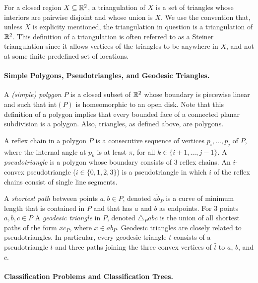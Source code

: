 \documentclass[lotsofwhite]{patmorin}
\newcommand{\interior}{\mathrm{int}}
\newcommand{\z}[1]{{\hat{#1}}}
\begin{document}
For a closed region $X\subseteq \mathbb{R}^2$, a triangulation of $X$ is a set
of triangles whose interiors are pairwise disjoint and whose union is
$X$.  We use the convention that, unless $X$ is explicity mentioned,
the triangulation in question is a triangulation of $\mathbb{R}^2$.  This
definition of a triangulation is often referred to as a Steiner
triangulation since it allows vertices of the triangles to be anywhere
in $X$, and not at some finite predefined set of locations.

\paragraph{Simple Polygons, Pseudotriangles, and Geodesic Triangles.}

A \emph{(simple) polygon} $P$ is a closed subset of $\mathbb{R}^2$ whose
boundary is piecewise linear and such that $\interior(P)$ is homeomorphic
to an open disk.  Note that this definition of a polygon implies that
every bounded face of a connected planar subdivision is a
polygon.  Also, triangles, as defined above, are polygons.  

A reflex chain in a polygon $P$ is a consecutive sequence of vertices
$p_i,\ldots,p_j$ of $P$, where the internal angle at $p_k$ is at least
$\pi$, for all $k\in\{i+1,\ldots,j-1\}$. A \emph{pseudotriangle} is a
polygon whose boundary consists of 3 reflex chains.  An $i$-convex
pseudotriangle ($i\in\{0,1,2,3\}$) is a pseudotriangle in which $i$ of
the reflex chains consist of single line segments.

A \emph{shortest path} between points $a,b\in P$, denoted
$\overline{ab}_P$ is a curve of minimum length that is contained in
$P$ and that has $a$ and $b$ as endpoints.  For 3 points $a,b,c\in P$
A \emph{geodesic triangle} in $P$, denoted $\triangle_P abc$ is the
union of all shortest paths of the form $\overline{xc}_P$, where
$x\in\overline{ab}_P$.  Geodesic triangles are closely related to
pseudotriangles.  In particular, every geodesic triangle $t$ consists
of a pseudotriangle $\z t$ and three paths joining the three convex
vertices of $\z t$ to $a$, $b$, and $c$.

\paragraph{Classification Problems and Classification Trees.}
\end{document}
